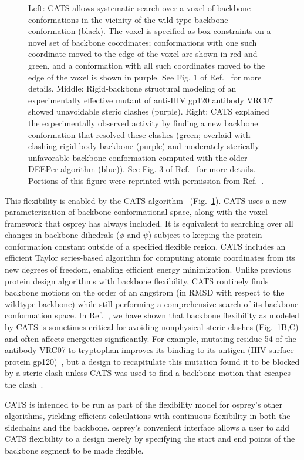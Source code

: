 \begin{figure}
\caption{Left: CATS allows systematic search over a voxel of backbone conformations in the vicinity of the wild-type backbone conformation (black).  The voxel is specified as box constraints on a novel set of backbone coordinates; conformations with one such coordinate moved to the edge of the voxel are shown in red and green, and a conformation with all such coordinates moved to the edge of the voxel is shown in purple.  See Fig. 1 of Ref.~ for more details.  Middle: Rigid-backbone structural modeling of an experimentally effective mutant of anti-HIV gp120 antibody VRC07 showed unavoidable steric clashes (purple).  Right: CATS explained the experimentally observed activity by finding a new backbone conformation that resolved these clashes (green; overlaid with clashing rigid-body backbone (purple) and moderately sterically unfavorable backbone conformation computed with the older DEEPer algorithm (blue)).  See Fig. 3 of Ref.~ for more details.   Portions of this figure were reprinted with permission from Ref.~.  }
\label{fig:cats}
\end{figure}

This flexibility is enabled by the CATS algorithm~\cite{CATS} (Fig.~\ref{fig:cats}).  CATS uses a new parameterization of backbone conformational space, along with the voxel framework that {\sc osprey} has always included.  It is equivalent to searching over all changes in backbone dihedrals ($\phi$ and $\psi$) subject to keeping the protein conformation constant outside of a specified flexible region. CATS includes an efficient Taylor series-based algorithm for computing atomic coordinates from its new degrees of freedom, enabling efficient energy minimization.  Unlike previous protein design algorithms with backbone flexibility, CATS routinely finds backbone motions on the order of an angstrom (in RMSD with respect to the wildtype backbone) while still performing a comprehensive search of its backbone conformation space.  In Ref.~, we have shown that backbone flexibility as modeled by CATS is sometimes critical for avoiding nonphysical steric clashes (Fig.~\ref{fig:cats}B,C) and often affects energetics significantly.  For example, mutating residue 54 of the antibody VRC07 to tryptophan improves its binding to its antigen (HIV surface protein gp120)~\cite{VRC07_enhance}, but a design to recapitulate this mutation found it to be blocked by a steric clash unless CATS was used to find a backbone motion that escapes the clash~\cite{CATS}.  

CATS is intended to be run as part of the flexibility model for {\sc osprey}'s other algorithms, yielding efficient calculations with continuous flexibility in both the sidechains and the backbone. {\sc osprey}'s convenient interface allows a user to add CATS flexibility to a design merely by specifying the start and end points of the backbone segment to be made flexible.  
